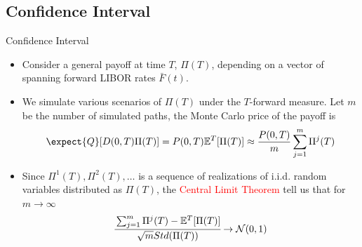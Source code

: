 \documentclass{beamer}
\begin{document}

\subsection{Confidence Interval}
\begin{frame}{Confidence Interval}
  \begin{itemize}
  \item<1-> Consider a general payoff at time $T$, $\Pi(T)$, depending on a vector of spanning forward LIBOR rates $\bar{F}(t)$. %
  \item<2-> We simulate various scenarios of $\Pi(T)$ under the $T$-forward measure. Let $m$ be the number of simulated paths, the Monte Carlo price of the payoff is
    \begin{equation*}
      \expect{Q}[D(0,T)\Pi(T)] = P(0,T)\mathbb{E}^T[\Pi(T)]\approx \frac{P(0,T)}{m}\sum_{j=1}^{m}\Pi^j(T)
    \end{equation*}
  \item<3-> Since $\Pi^1(T), \Pi^2(T),\ldots$ is a sequence of realizations of i.i.d. random variables distributed as $\Pi(T)$, the \textcolor{red}{Central Limit Theorem} tell us that for $m\rightarrow\infty$
    \begin{equation*}
      \cfrac{\sum_{j=1}^{m}\Pi^j(T)-\mathbb{E}^T[\Pi(T)]}{\sqrt{m} Std(\Pi(T))}\rightarrow \mathcal{N}(0,1)
    \end{equation*}
  \end{itemize}
\end{frame}
\end{document}

